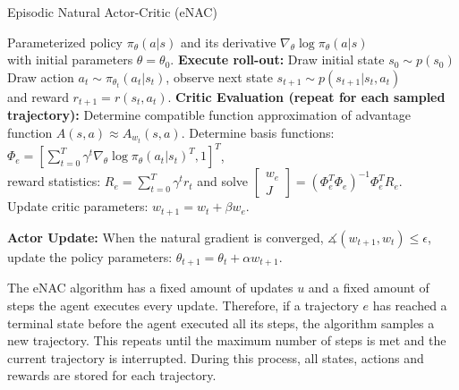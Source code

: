 \begin{algorithm}
	\caption{Episodic Natural Actor-Critic (eNAC)}\label{enac-algo}
	\begin{algorithmic}[1]
		\REQUIRE Parameterized policy $\pi_{\theta}(a|s)$ and its derivative $\nabla_\theta\log\pi_{\theta}(a|s)$\\
		\hspace{1.05cm}  with initial parameters $\theta=\theta_0$.
		\STATE \textbf{Execute roll-out:} Draw initial state $s_0 \sim p(s_0)$
		\STATE Draw action $a_t\sim\pi_{\theta_t}(a_t|s_t)$, observe next state $s_{t+1} \sim p(s_{t+1}|s_t, a_t)$\\
		and reward $r_{t+1} = r(s_t, a_t)$.
		\ENDFOR
		\ENDFOR
		\STATE \textbf{Critic Evaluation (repeat for each sampled trajectory):} Determine compatible function approximation of advantage function $A(s,a) \approx A_{w_t}(s, a)$.
		\STATE Determine basis functions: $\Phi_e = \left[\sum_{t=0}^T\gamma^t\nabla_\theta\log\pi_{\theta}(a_t|s_t)^T, 1\right]^T$, \\
		reward statistics: $R_e=\sum_{t=0}^T\gamma^t r_t$ and solve $\begin{bmatrix} w_{e}\\J \end{bmatrix} = (\Phi_e^T \Phi_e)^{-1} \Phi_e^T R_e$.\\
		Update critic parameters: $w_{t+1} = w_t + \beta w_{e}$.
		
		\STATE \textbf{Actor Update:} When the natural gradient is converged, $\measuredangle (w_{t+1}, w_t)\leq\epsilon$, update the policy parameters: $\theta_{t+1} = \theta_t + \alpha w_{t+1}$.
		\ENDFOR
	\end{algorithmic}
\end{algorithm}

\noindent The eNAC algorithm has a fixed amount of updates $u$ and a fixed amount of steps the agent executes every update. Therefore, if a trajectory $e$ has reached a terminal state before the agent executed all its steps, the algorithm samples a new trajectory. This repeats until the maximum number of steps is met and the current trajectory is interrupted. During this process, all states, actions and rewards are stored for each trajectory.

